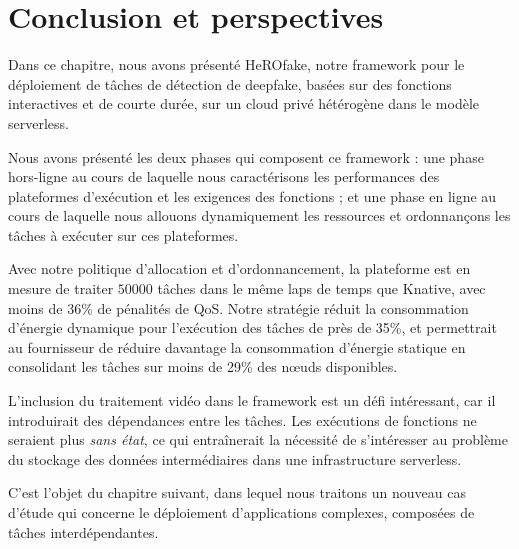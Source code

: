 \section{Conclusion et perspectives}
\label{section:herofake-conclusion}

Dans ce chapitre, nous avons présenté HeROfake, notre framework pour le déploiement de tâches de détection de deepfake, basées sur des fonctions interactives et de courte durée, sur un cloud privé hétérogène dans le modèle serverless.

Nous avons présenté les deux phases qui composent ce framework : une phase hors-ligne au cours de laquelle nous caractérisons les performances des plateformes d'exécution et les exigences des fonctions ; et une phase en ligne au cours de laquelle nous allouons dynamiquement les ressources et ordonnançons les tâches à exécuter sur ces plateformes.


Avec notre politique d'allocation et d'ordonnancement, la plateforme est en mesure de traiter $50 000$ tâches dans le même laps de temps que Knative, avec moins de 36\% de pénalités de QoS. Notre stratégie réduit la consommation d'énergie dynamique pour l'exécution des tâches de près de 35\%, et permettrait au fournisseur de réduire davantage la consommation d'énergie statique en consolidant les tâches sur moins de 29\% des nœuds disponibles.

L'inclusion du traitement vidéo dans le framework est un défi intéressant, car il introduirait des dépendances entre les tâches. Les exécutions de fonctions ne seraient plus \textit{sans état}, ce qui entraînerait la nécessité de s'intéresser au problème du stockage des données intermédiaires dans une infrastructure serverless.

C'est l'objet du chapitre suivant, dans lequel nous traitons un nouveau cas d'étude qui concerne le déploiement d'applications complexes, composées de tâches interdépendantes.

